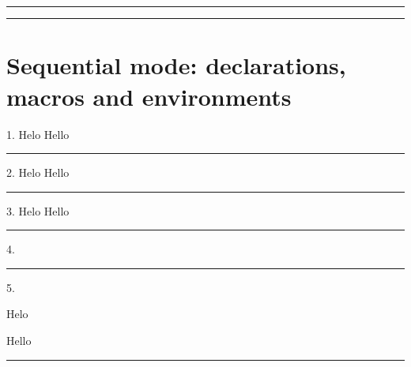 \documentclass{article}
\title{\cym{Croeso}\eng{Welcome}}
\author{DE}
\date{\cym{\today}\eng{\today}}
\begin{document}
\maketitle

\makeatletter
{}\\
\\
\makeatother

\bigskip\hrule\bigskip


\begin{multicols}

\begin{cymraeg}
\begin{abstract}
\lipsum[1]
\end{abstract}
\end{cymraeg}

\begin{english}
\begin{abstract}
\lipsum[2]
\end{abstract}
\end{english}

\end{multicols}

\bigskip\hrule\bigskip

\section{Sequential mode: declarations, macros and environments}

1. \cy Helo \en Hello \zz

\bigskip\hrule\bigskip

2. {\cy Helo} {\en Hello} 

\bigskip\hrule\bigskip

3. {\cy Helo \en Hello}

\bigskip\hrule\bigskip

4.  

\bigskip\hrule\bigskip

5.
\begin{cymraeg}
Helo
\end{cymraeg}
\begin{english}
Hello
\end{english}

\bigskip\hrule\bigskip
\end{document}
